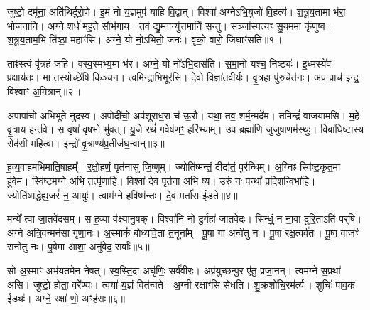 \clearpage
{}
\setcounter{anuvakam}{0}

जुष्टो॒ दमू॑ना॒ अति॑थिर्दुरो॒णे।
इ॒मं नो॑ य॒ज्ञमुप॑ याहि वि॒द्वान्।
विश्वा॑ अग्ने\-ऽभि॒युजो॑ वि॒हत्य॑।
श॒त्रू॒य॒तामा भ॑रा॒ भोज॑नानि।
अग्ने॒ शर्ध॑ मह॒ते सौभ॑गाय।
तव॑ द्यु॒म्नान्यु॑त्त॒मानि॑ सन्तु।
सञ्जा᳚स्प॒त्यꣳ सु॒यम॒मा कृ॑णुष्व।
श॒त्रू॒य॒ताम॒भि ति॑ष्ठा॒ महाꣳ॑सि।
अग्ने॒ यो नो॒\-ऽभितो॒ जनः॑।
वृको॒ वारो॒ जिघाꣳ॑सति॥१॥

ताꣴस्त्वं वृ॑त्रहं जहि।
वस्व॒स्मभ्य॒मा भ॑र।
अग्ने॒ यो नो॑\-ऽभि॒दास॑ति।
स॒मा॒नो यश्च॒ निष्ट्यः॑।
इ॒ध्मस्ये॑व प्र॒क्षाय॑तः।
मा तस्योच्छे॑षि॒ किञ्च॒न।
त्वमि॑न्द्राभि॒भूर॑सि।
दे॒वो विज्ञा॑तवीर्यः।
वृ॒त्र॒हा पु॑रु॒चेत॑नः।
अप॒ प्राच॑ इन्द्र॒ विश्वाꣳ॑ अ॒मित्रान्॑॥२॥

अपापा॑चो अभिभूते नुदस्व।
अपोदी॑चो॒ अप॑शूराध॒रा च॑ ऊ॒रौ।
यथा॒ तव॒ शर्म॒न्मदे॑म।
तमिन्द्रं॑ वाजयामसि।
म॒हे वृ॒त्राय॒ हन्त॑वे।
स वृषा॑ वृष॒भो भु॑वत्।
यु॒जे रथं॑ ग॒वेष॑ण॒ꣳ॒ हरि॑भ्याम्।
उप॒ ब्रह्मा॑णि जुजुषा॒णम॑स्थुः।
विबा॑धिष्टा॒स्य रोद॑सी महि॒त्वा।
इन्द्रो॑ वृ॒त्राण्य॑प्र॒तीज॑घ॒न्वान्॥३॥

ह॒व्य॒वाह॑मभिमाति॒षाहम्᳚।
र॒क्षो॒हणं॒ पृत॑नासु जि॒ष्णुम्।
ज्योति॑ष्मन्तं॒ दीद्य॑तं॒ पुर॑न्धिम्।
अ॒ग्निꣴ स्वि॑ष्ट॒कृत॒मा हु॑वेम।
स्वि॑ष्टमग्ने अ॒भि तत्पृ॑णाहि।
विश्वा॑ देव॒ पृत॑ना अ॒भि ष्य।
उ॒रुं नः॒ पन्थां᳚ प्रदि॒शन्विभा॑हि।
ज्योति॑ष्मद्धेह्य॒जरं॑ न॒ आयुः॑।
त्वाम॑ग्ने ह॒विष्म॑न्तः।
दे॒वं मर्ता॑स ईडते॥४॥

मन्ये᳚ त्वा जा॒तवे॑दसम्।
स ह॒व्या व॑क्ष्यानु॒षक्।
विश्वा॑नि नो दु॒र्गहा॑ जातवेदः।
सिन्धुं॒ न ना॒वा दु॑रि॒ताऽति॑ पर्‌\mbox{}षि।
अग्ने॑ अत्रि॒वन्मन॑सा गृणा॒नः।
अ॒स्माकं॑ बोध्यवि॒ता त॒नूना᳚म्।
पू॒षा गा अन्वे॑तु नः।
पू॒षा र॑क्ष॒त्वर्व॑तः।
पू॒षा वाजꣳ॑ सनोतु नः।
पू॒षेमा आशा॒ अनु॑वेद॒ सर्वाः᳚॥५॥

सो अ॒स्माꣳ अभ॑यतमेन नेषत्।
स्व॒स्ति॒दा अघृ॑णिः॒ सर्व॑वीरः।
अप्र॑युच्छन्पु॒र ए॑तु॒ प्रजा॒नन्।
त्वम॑ग्ने स॒प्रथा॑ असि।
जुष्टो॒ होता॒ वरे᳚ण्यः।
त्वया॑ य॒ज्ञं वित॑न्वते।
अ॒ग्नी रक्षाꣳ॑सि सेधति।
शु॒क्र\-शो॑चि॒रम॑र्त्यः।
शुचिः॑ पाव॒क ईड्यः॑।
अग्ने॒ रक्षा॑ णो॒ अꣳह॑सः॥६॥

